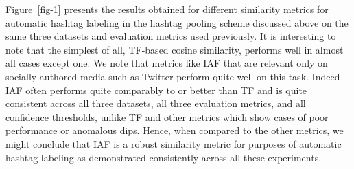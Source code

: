 \documentclass[10pt,a5paper,twoside]{article}
\begin{document}
Figure~\ref{fig-1} presents the results obtained for different
similarity metrics for automatic hashtag labeling in the hashtag
pooling scheme discussed above on the same three datasets and
evaluation metrics used previously.  It is interesting to note that
the simplest of all, TF-based cosine similarity, performs well in
almost all cases except one.  We note that metrics like IAF that are
relevant only on socially authored media such as Twitter perform quite
well on this task.  Indeed IAF often performs quite comparably to or
better than TF and is quite consistent across all three datasets, all
three evaluation metrics, and all confidence thresholds, unlike TF and
other metrics which show cases of poor performance or anomalous
dips.  Hence, when compared to the other metrics, we might conclude
that IAF is a robust similarity metric for purposes of automatic
hashtag labeling as demonstrated consistently across all these experiments.
\end{document}

